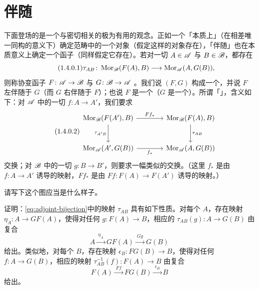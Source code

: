 \section{伴随}

下面登场的是一个与\trUniversalProperty{}密切相关的极为有用的观念。正如一个\trUniversalProperty{}「本质上」（在相差唯一同构的意义下）确定范畴中的一个对象（假定这样的对象存在），「伴随」也在本质意义上确定一个函子（同样假定它存在）。若对一切 $A\in\mathscr{A}$ 与 $B\in\mathscr{B}$，都存在\trNatural\trBijection
\begin{equation*}\tag{1.4.0.1}\label{eq:adjoint-bijection}
\tau_{AB}\colon\operatorname{Mor}_{\mathscr{B}}(F(A),B)\longrightarrow\operatorname{Mor}_{\mathscr{A}}(A,G(B)),
\end{equation*}
则称协变函子 $F\colon\mathscr{A}\to\mathscr{B}$ 与 $G\colon\mathscr{B}\to\mathscr{A}$ \trAdjoint。我们说 $(F,G)$ 构成一个\trAdjointPair，并说 $F$ 左伴随于 $G$（而 $G$ 右伴随于 $F$）；也说 $F$ 是一个\trLeftAdjoint（$G$ 是一个\trRightAdjoint）。所谓「\trNatural」，含义如下：对 $\mathscr{A}$ 中的一切 $f\colon A\to A'$，我们要求
\begin{equation*}\tag{1.4.0.2}\label{eq:adjoint-naturality}
\begin{tikzcd}[row sep=2.6em, column sep=3.8em]
\Mor_{\scr{B}}(F(A'),B) \ar[r,"{Ff_*}"] \ar[d,"\tau_{A'B}"'] & \Mor_{\scr{B}}(F(A),B) \ar[d,"\tau_{AB}"] \\
\Mor_{\scr{A}}(A',G(B)) \ar[r,"{f_*}"'] & \Mor_{\scr{A}}(A,G(B))
\end{tikzcd}
\end{equation*}
交换；对 $\mathscr{B}$ 中的一切 $g\colon B\to B'$，则要求一幅类似的\trCommutativeDiagram{}交换。（这里 $f_*$ 是由 $f\colon A\to A'$ 诱导的映射，$Ff_*$ 是由 $Ff\colon F(A)\to F(A')$ 诱导的映射。）

\begin{exercise}\label{ex:reverse-naturality-square}
请写下这个图应当是什么样子。
\end{exercise}

\begin{exercise}\label{ex:unit-counit-construction}
证明：\eqref{eq:adjoint-bijection}中的映射 $\tau_{AB}$ 具有如下性质。对每个 $A$，存在映射 $\eta_A\colon A\to GF(A)$，使得对任何 $g\colon F(A)\to B$，相应的 $\tau_{AB}(g)\colon A\to G(B)$ 由复合
\[
A \mathrel{\xrightarrow{\ \eta_A\ }} GF(A) \mathrel{\xrightarrow{\ Gg\ }} G(B)
\]
给出。类似地，对每个 $B$，存在映射 $\epsilon_B\colon FG(B)\to B$，使得对任何 $f\colon A\to G(B)$，相应的映射 $\tau_{AB}^{-1}(f)\colon F(A)\to B$ 由复合
\[
F(A) \mathrel{\xrightarrow{\ Ff\ }} FG(B) \mathrel{\xrightarrow{\ \epsilon_B\ }} B
\]
给出。
\end{exercise}

